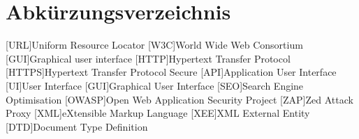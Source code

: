 \newpage
\chapter*{Abkürzungsverzeichnis}
\begin{acronym}
    [URL]{Uniform Resource Locator}
    [W3C]{World Wide Web Consortium}
    [GUI]{Graphical user interface}
    [HTTP]{Hypertext Transfer Protocol}
    [HTTPS]{Hypertext Transfer Protocol Secure}
    [API]{Application User Interface}
    [UI]{User Interface}
    [GUI]{Graphical User Interface}
    [SEO]{Search Engine Optimisation}
    [OWASP]{Open Web Application Security Project}
    [ZAP]{Zed Attack Proxy}
    [XML]{eXtensible Markup Language}
    [XEE]{XML External Entity}
    [DTD]{Document Type Definition}
\end{acronym}